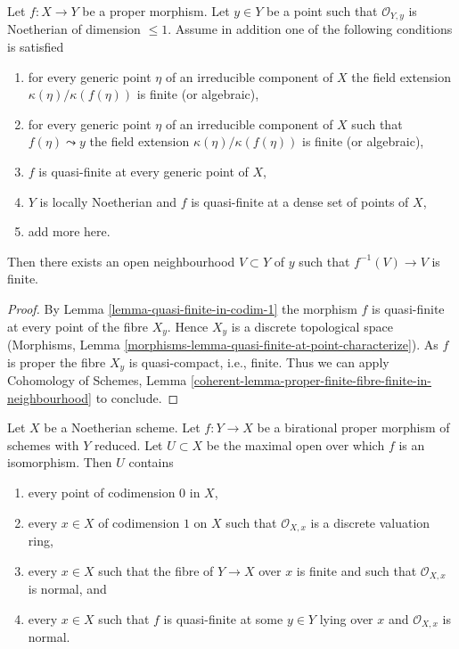 \begin{lemma}
\label{lemma-finite-in-codim-1}
Let $f : X \to Y$ be a proper morphism. Let $y \in Y$ be a point
such that $\mathcal{O}_{Y, y}$ is Noetherian of dimension $\leq 1$.
Assume in addition one of the following conditions is satisfied
\begin{enumerate}
\item for every generic point $\eta$ of an irreducible component
of $X$ the field extension $\kappa(\eta)/\kappa(f(\eta))$
is finite (or algebraic),
\item for every generic point $\eta$ of an irreducible component
of $X$ such that $f(\eta) \leadsto y$ the field extension
$\kappa(\eta)/\kappa(f(\eta))$ is finite (or algebraic),
\item $f$ is quasi-finite at every generic point of $X$,
\item $Y$ is locally Noetherian and $f$
is quasi-finite at a dense set of points of $X$,
\item add more here.
\end{enumerate}
Then there exists an open neighbourhood $V \subset Y$ of $y$ such that
$f^{-1}(V) \to V$ is finite.
\end{lemma}

\begin{proof}
By Lemma \ref{lemma-quasi-finite-in-codim-1} the morphism $f$ is
quasi-finite at every point of the fibre $X_y$. Hence
$X_y$ is a discrete topological space
(Morphisms, Lemma \ref{morphisms-lemma-quasi-finite-at-point-characterize}).
As $f$ is proper the fibre $X_y$ is quasi-compact, i.e., finite.
Thus we can apply Cohomology of Schemes, Lemma
\ref{coherent-lemma-proper-finite-fibre-finite-in-neighbourhood}
to conclude.
\end{proof}

\begin{lemma}
\label{lemma-modification-normal-iso-over-codimension-1}
Let $X$ be a Noetherian scheme. Let $f : Y \to X$ be a birational proper
morphism of schemes with $Y$ reduced. Let $U \subset X$ be the
maximal open over which $f$ is an isomorphism. Then $U$ contains
\begin{enumerate}
\item every point of codimension $0$ in $X$,
\item every $x \in X$ of codimension $1$ on $X$ such that
$\mathcal{O}_{X, x}$ is a discrete valuation ring,
\item every $x \in X$ such that the fibre of $Y \to X$ over $x$ is
finite and such that $\mathcal{O}_{X, x}$ is normal, and
\item every $x \in X$ such that $f$ is quasi-finite at some
$y \in Y$ lying over $x$ and $\mathcal{O}_{X, x}$ is normal.
\end{enumerate}
\end{lemma}

